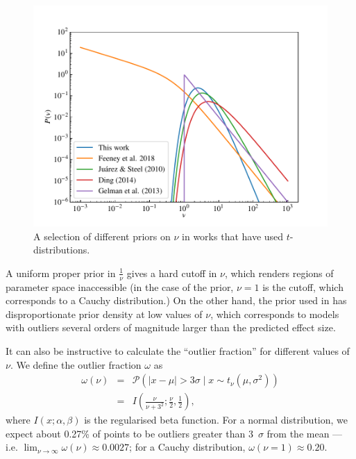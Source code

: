 \documentclass[fleqn,usenatbib]{mnras}
\begin{document}
\begin{figure}
	\includegraphics[width=\columnwidth]{graphics/pdf_nu}
    \caption{A selection of different priors on $\nu$ in works that have used
    $t$-distributions.}
    \label{fig:priors.pdf}
\end{figure}

A uniform proper prior in $\frac1\nu$ gives a hard cutoff in $\nu$, which
renders regions of parameter space inaccessible (in the case of the
\citet{Gelman:2013} prior, $\nu = 1$ is the cutoff, which corresponds to a
Cauchy distribution.) On the other hand, the prior used in \citet{Feeney:2018}
has disproportionate prior density at low values of $\nu$, which corresponds to
models with outliers several orders of magnitude larger than the predicted
effect size.

It can also be instructive to calculate the ``outlier fraction'' for different
values of $\nu$. We define the outlier fraction $\omega$ as
\begin{eqnarray}
    \omega(\nu) &=& \mathcal P\left(|x - \mu| > 3 \sigma \mid x \sim t_\nu (\mu, \sigma^2) \right) \\
    &=& I\left(\frac{\nu}{\nu + 3^2};\frac\nu2, \frac12\right),
\end{eqnarray}
where $I(x; \alpha, \beta)$ is the regularised beta function. For a normal
distribution, we expect about 0.27\% of points to be outliers greater than
3~$\sigma$ from the mean --- i.e. $\lim_{\nu \rightarrow \infty}\omega(\nu)
\approx 0.0027$; for a Cauchy distribution, $\omega(\nu = 1) \approx 0.20$.
\end{document}
